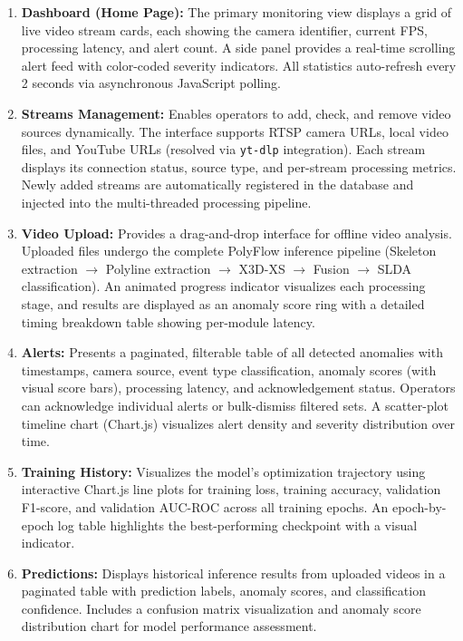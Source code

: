 \documentclass[12pt]{article}
\begin{document}
\begin{enumerate}
    \item \textbf{Dashboard (Home Page):} The primary monitoring view displays a grid of live video stream cards, each showing the camera identifier, current FPS, processing latency, and alert count. A side panel provides a real-time scrolling alert feed with color-coded severity indicators. All statistics auto-refresh every 2 seconds via asynchronous JavaScript polling.
    
    \item \textbf{Streams Management:} Enables operators to add, check, and remove video sources dynamically. The interface supports RTSP camera URLs, local video files, and YouTube URLs (resolved via \texttt{yt-dlp} integration). Each stream displays its connection status, source type, and per-stream processing metrics. Newly added streams are automatically registered in the database and injected into the multi-threaded processing pipeline.
    
    \item \textbf{Video Upload:} Provides a drag-and-drop interface for offline video analysis. Uploaded files undergo the complete PolyFlow inference pipeline (Skeleton extraction $\to$ Polyline extraction $\to$ X3D-XS $\to$ Fusion $\to$ SLDA classification). An animated progress indicator visualizes each processing stage, and results are displayed as an anomaly score ring with a detailed timing breakdown table showing per-module latency.
    
    \item \textbf{Alerts:} Presents a paginated, filterable table of all detected anomalies with timestamps, camera source, event type classification, anomaly scores (with visual score bars), processing latency, and acknowledgement status. Operators can acknowledge individual alerts or bulk-dismiss filtered sets. A scatter-plot timeline chart (Chart.js) visualizes alert density and severity distribution over time.
    
    \item \textbf{Training History:} Visualizes the model's optimization trajectory using interactive Chart.js line plots for training loss, training accuracy, validation F1-score, and validation AUC-ROC across all training epochs. An epoch-by-epoch log table highlights the best-performing checkpoint with a visual indicator.
    
    \item \textbf{Predictions:} Displays historical inference results from uploaded videos in a paginated table with prediction labels, anomaly scores, and classification confidence. Includes a confusion matrix visualization and anomaly score distribution chart for model performance assessment.
\end{enumerate}
\end{document}
